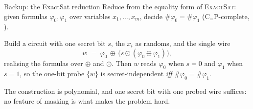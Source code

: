 \documentclass[aspectratio=169,10pt]{beamer}
\newcommand{\Rs}{\mathcal{R}}
\newcommand{\va}{\mathbf{a}}
\newcommand{\vb}{\mathbf{b}}
\newcommand{\CeqP}{\mathrm{C}_{=}\mathrm{P}}
\begin{document}
\begin{frame}{Backup: the ExactSat reduction}
  Reduce from the equality form of \textsc{ExactSat}: given formulas
  $\varphi_0, \varphi_1$ over variables $x_1, \dots, x_m$, decide
  $\#\varphi_0 = \#\varphi_1$ ($\CeqP$-complete,
  \parencite{wagner1986complexity}).
  \medskip

  Build a circuit with one secret bit $s$, the $x_i$ as randoms, and the
  single wire
  \[
    w \;=\; \varphi_0 \,\oplus\, \bigl(s \odot (\varphi_0 \oplus \varphi_1)\bigr),
  \]
  realising the formulas over $\oplus$ and $\odot$. Then $w$ reads $\varphi_0$
  when $s = 0$ and $\varphi_1$ when $s = 1$, so the one-bit probe $\{w\}$ is
  secret-independent \emph{iff} $\#\varphi_0 = \#\varphi_1$.
  \medskip

  The construction is polynomial, and one secret bit with one probed wire
  suffices: no feature of masking is what makes the problem hard.
\end{frame}


\end{document}
